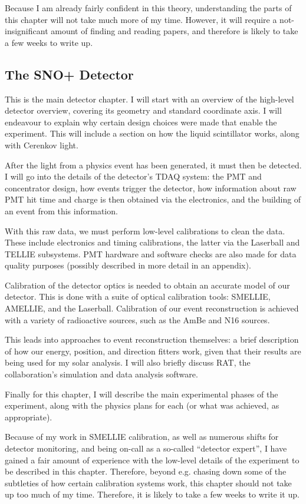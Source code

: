 Because I am already fairly confident in this theory, understanding the parts of this chapter will not take much more of my time. However, it will require a not-insignificant amount of finding and reading papers, and therefore is likely to take a few weeks to write up.

\subsection{The SNO+ Detector}
This is the main detector chapter. I will start with an overview of the high-level detector overview, covering its geometry and standard coordinate axis. I will endeavour to explain why certain design choices were made that enable the experiment. This will include a section on how the liquid scintillator works, along with Cerenkov light.

After the light from a physics event has been generated, it must then be detected. I will go into the details of the detector's TDAQ system: the PMT and concentrator design, how events trigger the detector, how information about raw PMT hit time and charge is then obtained via the electronics, and the building of an event from this information.

With this raw data, we must perform low-level calibrations to clean the data. These include electronics and timing calibrations, the latter via the Laserball and TELLIE subsystems. PMT hardware and software checks are also made for data quality purposes (possibly described in more detail in an appendix).

Calibration of the detector optics is needed to obtain an accurate model of our detector. This is done with a suite of optical calibration tools: SMELLIE, AMELLIE, and the Laserball. Calibration of our event reconstruction is achieved with a variety of radioactive sources, such as the AmBe and N16 sources.

This leads into approaches to event reconstruction themselves: a brief description of how our energy, position, and direction fitters work, given that their results are being used for my solar analysis. I will also briefly discuss RAT, the collaboration's simulation and data analysis software.

Finally for this chapter, I will describe the main experimental phases of the experiment, along with the physics plans for each (or what was achieved, as appropriate).

Because of my work in SMELLIE calibration, as well as numerous shifts for detector monitoring, and being on-call as a so-called ``detector expert'', I have gained a fair amount of experience with the low-level details of the experiment to be described in this chapter. Therefore, beyond e.g. chasing down some of the subtleties of how certain calibration systems work, this chapter should not take up too much of my time. Therefore, it is likely to take a few weeks to write it up.

